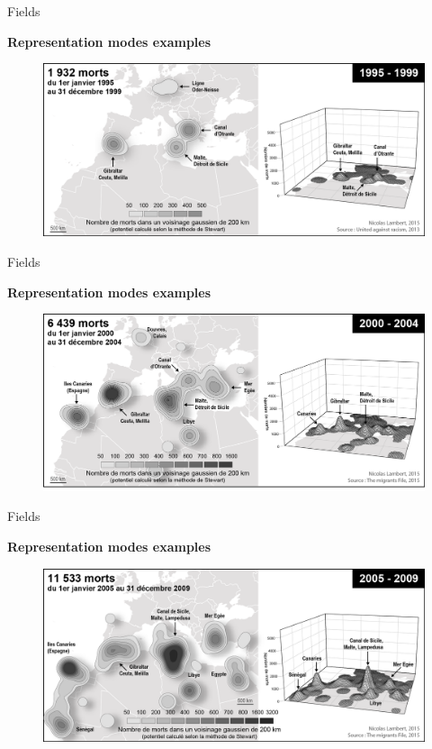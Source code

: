 \begin{frame}{Fields}

\textbf{Representation modes examples}

\begin{figure}
\includegraphics[width=11.5cm]{Migrants1.png}
\end{figure}

\end{frame}

\begin{frame}{Fields}

\textbf{Representation modes examples}

\begin{figure}
\includegraphics[width=11.5cm]{Migrants2.png}
\end{figure}

\end{frame}


\begin{frame}{Fields}

\textbf{Representation modes examples}

\begin{figure}
\includegraphics[width=11.5cm]{Migrants3.png}
\end{figure}

\end{frame}


